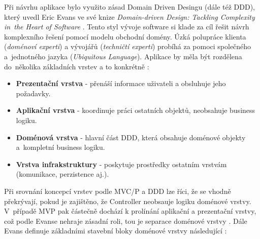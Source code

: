 Při návrhu aplikace bylo využito zásad Domain Driven Desingu (dále též DDD), který uvedl Eric Evans ve své knize \textit{Domain-driven Design: Tackling Complexity in~the Heart of Software} \cite{EvansDDD}. Tento styl vývoje software si klade za cíl řešit návrh komplexního řešení pomocí modelu obchodní domény. Úzká polupráce klienta (\textit{doménoví experti}) a vývojářů (\textit{techničtí experti}) probíhá za pomoci společného a~jednotného jazyka (\textit{Ubiquitous Language}). Aplikace by měla být rozdělena do~několika základních vrstev a to konkrétně \cite{EvansDDD}:

\begin{itemize}
	\item \textbf{Prezentační vrstva} - přenáší informace uživateli a obsluhuje jeho požadavky.
	\item \textbf{Aplikační vrstva} - koordinuje práci ostatních objektů, neobsahuje business logiku.
	\item \textbf{Doménová vrstva} - hlavní část DDD, která obsahuje doménové objekty a~kompletní business logiku.
	\item \textbf{Vrstva infrakstruktury} - poskytuje prostředky ostatním vrstvám (komunikace, perzistence aj.).
\end{itemize}
\clearpage
Při srovnání koncepcí vrstev podle MVC/P a DDD lze říci, že se vhodně překrývají, pokud je zajištěno, že Controller neobsauje logiku doménové vrstvy. V~případě MVP pak částečně dochází k prolínání aplikační a prezentační vrstvy, což podle Evanse nehraje zásadní roli, tou je separace doménové vrstvy \cite{EvansDDD}. Dále Evans definuje základními stavební bloky doménové vrstvy následující \cite{EvansDDD}:
